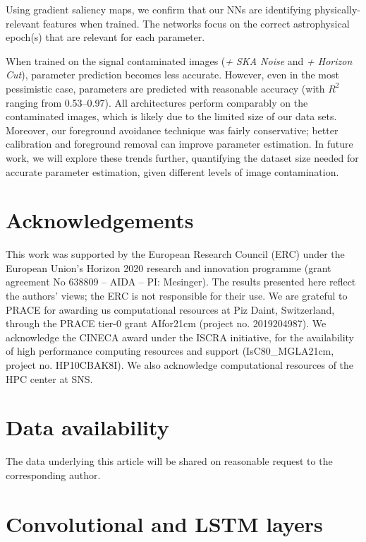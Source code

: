 \documentclass[fleqn,usenatbib]{mnras}
\begin{document}
Using gradient saliency maps, we confirm that our NNs are identifying physically-relevant features when trained.  The networks focus on the correct astrophysical epoch(s) that are relevant for each parameter.

When trained on the signal contaminated images ({\it + SKA Noise} and {\it + Horizon Cut}), parameter prediction becomes less accurate.  However, even in the most pessimistic case, parameters are predicted with reasonable accuracy (with $R^2$ ranging from 0.53--0.97). All architectures perform comparably on the contaminated images, which is likely due to the limited size of our data sets. Moreover, our foreground avoidance technique was fairly conservative; better calibration and foreground removal can improve parameter estimation.  In future work, we will explore these trends further, quantifying the dataset size needed for accurate parameter estimation, given different levels of image contamination.

\section*{Acknowledgements}
This work was supported by the European Research
Council (ERC) under the European Union’s Horizon 2020
research and innovation programme (grant agreement No
638809 – AIDA – PI: Mesinger). The results presented here
reflect the authors’ views; the ERC is not responsible for
their use.  We are grateful to PRACE for awarding us computational resources at Piz Daint, Switzerland, through the PRACE tier-0
grant AIfor21cm (project no. 2019204987). 
We acknowledge the CINECA award under the ISCRA initiative, for the availability of high performance computing resources and support (IsC80\_MGLA21cm, project no. HP10CBAK8I). We also acknowledge computational resources of the HPC center at SNS.

\section*{Data availability}
The data underlying this article will be shared on reasonable request to the corresponding author.




\appendix
\section{Convolutional and LSTM layers} \label{app:layers}
\end{document}
